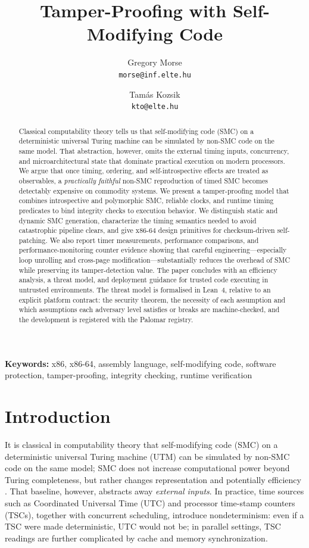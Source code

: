 \documentclass[11pt]{article}
\title{Tamper-Proofing with Self-Modifying Code}
\author[1]{Gregory Morse\\\texttt{morse@inf.elte.hu}}
\author[1]{Tam\'{a}s Kozsik\\\texttt{kto@elte.hu}}
\affil[1]{E\"{o}tv\"{o}s Lor\'{a}nd Tudom\'{a}nyegyetem / University (ELTE), Budapest, Hungary}
\date{}
\begin{document}
\pagestyle{empty}
\maketitle
\thispagestyle{empty}

\begin{abstract}
Classical computability theory tells us that self-modifying code (SMC) on a
deterministic universal Turing machine can be simulated by non-SMC code on the
same model.  That abstraction, however, omits the external timing inputs,
concurrency, and microarchitectural state that dominate practical execution on
modern processors.  We argue that once timing, ordering, and self-introspective
effects are treated as observables, a \emph{practically faithful} non-SMC
reproduction of timed SMC becomes detectably expensive on commodity systems.
We present a tamper-proofing model that combines introspective and polymorphic
SMC, reliable clocks, and runtime timing predicates to bind integrity checks to
execution behavior.  We distinguish static and dynamic SMC generation,
characterize the timing semantics needed to avoid catastrophic pipeline clears,
and give x86-64 design primitives for checksum-driven self-patching.  We also
report timer measurements, performance comparisons, and performance-monitoring
counter evidence showing that careful engineering---especially loop unrolling and
cross-page modification---substantially reduces the overhead of SMC while
preserving its tamper-detection value.  The paper concludes with an efficiency
analysis, a threat model, and deployment guidance for trusted code executing in
untrusted environments.
The threat model is formalised in Lean~4, relative to an explicit platform contract: the
security theorem, the necessity of each assumption and which assumptions each adversary level
satisfies or breaks are machine-checked, and the development is registered with the Palomar registry.
\end{abstract}

\noindent\textbf{Keywords:} x86, x86-64, assembly language, self-modifying code,
software protection, tamper-proofing, integrity checking, runtime verification

\section{Introduction}\label{sec:introduction}

It is classical in computability theory that self-modifying code (SMC) on a
deterministic universal Turing machine (UTM) can be simulated by non-SMC code
on the same model; SMC does not increase computational power beyond Turing
completeness, but rather changes representation and potentially efficiency
\cite{10.5555/1095587,hopcroft1979introduction,Arora_Barak_2009}.  That
baseline, however, abstracts away \emph{external inputs}.  In practice, time
sources such as Coordinated Universal Time (UTC) and processor time-stamp
counters (TSCs), together with concurrent scheduling, introduce nondeterminism:
even if a TSC were made deterministic, UTC would not be; in parallel settings,
TSC readings are further complicated by cache and memory synchronization.
\end{document}
